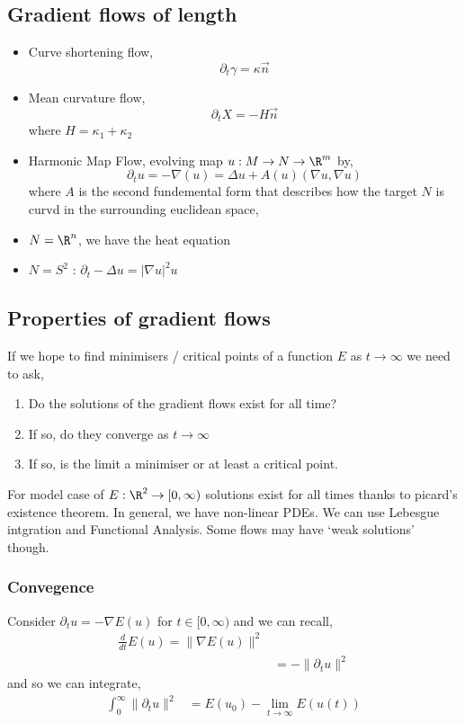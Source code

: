 \documentclass{article}
\begin{document}
\subsection{Gradient flows of length}
\begin{itemize}
  \item Curve shortening flow,
  $$ \partial_t \gamma = \kappa \vec n $$
  \item Mean curvature flow,
  $$ \partial_t X = - H\vec n $$
  where $H = \kappa_1 + \kappa_2$
  \item Harmonic Map Flow, evolving map $u : M \to N \to \R^m$ %
  by,
  $$ \partial_t u = -\nabla (u) = \Delta u + A(u)(\nabla u, \nabla u) $$
  where $A$ is the second fundemental form that describes how the target $N$ is curvd in the surrounding euclidean space,
  \item $N = \R^n$, we have the heat equation
  \item $N = S^2$ : $\partial_t - \Delta u = |\nabla u|^2 u$
\end{itemize}

\subsection{Properties of gradient flows}
If we hope to find minimisers / critical points of a function $E$ as $t \to \infty$ we need to ask,
\begin{enumerate}
  \item Do the solutions of the gradient flows exist for all time?
  \item If so, do they converge as $t \to \infty$
  \item If so, is the limit a minimiser or at least a critical point.
\end{enumerate}

For model case of $E : \R^2 \to [0, \infty)$ solutions exist for all times thanks to picard's existence theorem. In general, we have non-linear PDEs. We can use Lebesgue intgration and Functional Analysis. Some flows may have `weak solutions' though.

\subsubsection{Convegence}
Consider $\partial_t u = -\nabla E(u)$
for $t \in [0, \infty)$ and we can recall,
\begin{align*}
  \frac{d}{dt} E(u) = \|\nabla E(u)\|^2 \\
  &= -\|\partial_t u\|^2
\end{align*}
and so we can integrate,
\begin{align*}
  \int_0^\infty \|\partial_t u\|^2 &= E(u_0) - \lim_{t \to \infty} E(u(t))
\end{align*}
\end{document}
